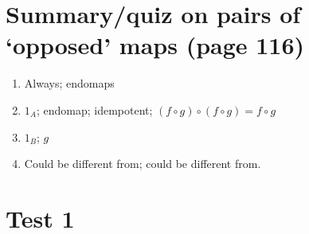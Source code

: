 \documentclass{article}
\theoremstyle{definition}
\theoremstyle{definition}
\theoremstyle{definition}
\begin{document}
\section*{Summary/quiz on pairs of `opposed' maps (page 116)}
\begin{enumerate}
  \item Always; endomaps
  \item $1_A$; endomap; idempotent; $(f \circ g) \circ (f \circ g) = f \circ g$
  \item $1_B$; $g$
  \item Could be different from; could be different from.
\end{enumerate}
\section*{Test 1}
\setcounter{subsection}{1}
\renewcommand{\thesubsection}{Test \arabic{subsection}}
\setcounter{solution-internal}{0}
\end{document}

